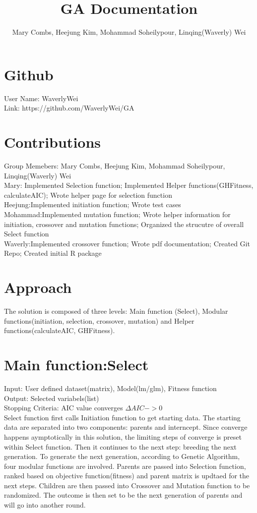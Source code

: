 \documentclass{article}\usepackage[]{graphicx}\usepackage[]{color}
\begin{document}
\title{GA Documentation}
\author{Mary Combs, Heejung Kim, Mohammad Soheilypour, Linqing(Waverly) Wei}
\maketitle

\section{Github}
User Name: WaverlyWei\\
Link: https://github.com/WaverlyWei/GA
\section{Contributions}
Group Memebers: Mary Combs, Heejung Kim, Mohammad Soheilypour, Linqing(Waverly) Wei\\

Mary: Implemented Selection function; Implemented Helper functions(GHFitness, calculateAIC); Wrote helper page for selection function\\

Heejung:Implemented initiation function; Wrote test cases\\

Mohammad:Implemented mutation function; Wrote helper information for initiation, crossover and mutation functions; Organized the strucutre of overall Select function\\

Waverly:Implemented crossover function; Wrote pdf documentation; Created Git Repo; Created initial R package
\section{Approach}
The solution is composed of three levels: Main function (Select), Modular functions(initiation, selection, crossover, mutation) and Helper functions(calculateAIC, GHFitness). \\
\section{Main function:Select}
Input: User defined dataset(matrix), Model(lm/glm), Fitness function\\
Output: Selected variabels(list)\\
Stopping Criteria: AIC value converges \(\Delta AIC -> 0\)\\

Select function first calls Initiation function to get starting data. The starting data are separated into two components: parents and interncept. Since converge happens aymptotically in this solution, the limiting steps of converge is preset within Select function. Then it continues to the next step: breeding the next generation. To generate the next generation, according to Genetic Algorithm, four modular functions are involved. Parents are passed into Selection function, ranked based on objective function(fitness) and parent matrix is updtaed for the next steps. Children are then passed into Crossover and Mutation function to be randomized. The outcome is then set to be the next generation of parents and will go into another round.
\end{document}
